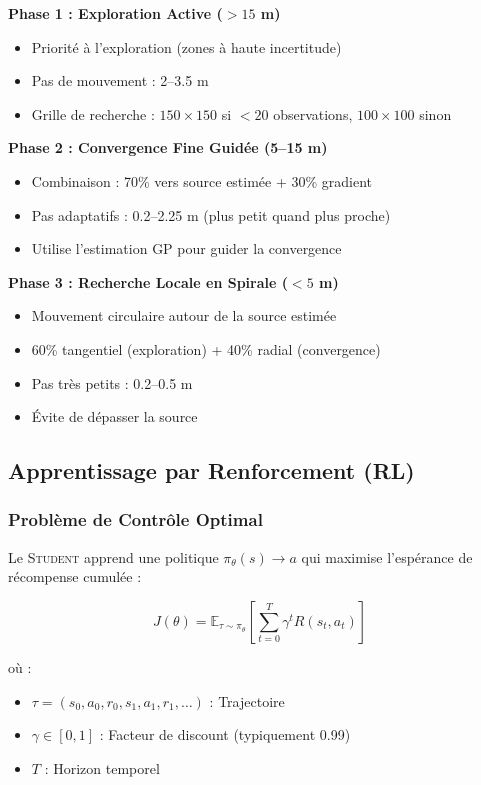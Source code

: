 \documentclass[12pt,a4paper]{article}
\newcommand{\student}{\textsc{Student}}
\newcommand{\gp}{\textsc{GP}}
\newcommand{\rl}{\textsc{RL}}
\begin{document}
\textbf{Phase 1 : Exploration Active ($> 15$ m)}
\begin{itemize}
    \item Priorité à l'exploration (zones à haute incertitude)
    \item Pas de mouvement : 2--3.5 m
    \item Grille de recherche : $150 \times 150$ si $< 20$ observations, $100 \times 100$ sinon
\end{itemize}

\textbf{Phase 2 : Convergence Fine Guidée (5--15 m)}
\begin{itemize}
    \item Combinaison : 70\% vers source estimée + 30\% gradient
    \item Pas adaptatifs : 0.2--2.25 m (plus petit quand plus proche)
    \item Utilise l'estimation \gp{} pour guider la convergence
\end{itemize}

\textbf{Phase 3 : Recherche Locale en Spirale ($< 5$ m)}
\begin{itemize}
    \item Mouvement circulaire autour de la source estimée
    \item 60\% tangentiel (exploration) + 40\% radial (convergence)
    \item Pas très petits : 0.2--0.5 m
    \item Évite de dépasser la source
\end{itemize}

\subsection{Apprentissage par Renforcement (\rl{})}

\subsubsection{Problème de Contrôle Optimal}

Le \student{} apprend une politique $\pi_\theta(s) \to a$ qui maximise l'espérance de récompense cumulée :

\begin{equation}
J(\theta) = \mathbb{E}_{\tau \sim \pi_\theta} \left[\sum_{t=0}^T \gamma^t R(s_t, a_t)\right]
\end{equation}

où :
\begin{itemize}
    \item $\tau = (s_0, a_0, r_0, s_1, a_1, r_1, \ldots)$ : Trajectoire
    \item $\gamma \in [0, 1]$ : Facteur de discount (typiquement 0.99)
    \item $T$ : Horizon temporel
\end{itemize}
\end{document}
